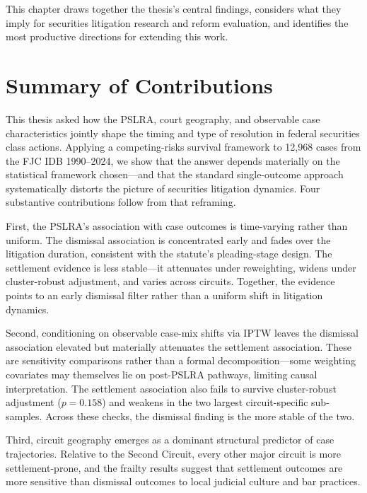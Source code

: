 
This chapter draws together the thesis's central findings,
considers what they imply for securities litigation research
and reform evaluation, and identifies the most productive
directions for extending this work.

\section{Summary of Contributions}

This thesis asked how the PSLRA, court geography, and
observable case characteristics jointly shape the timing and
type of resolution in federal securities class actions.
Applying a competing-risks survival framework to 12,968 cases
from the FJC IDB 1990--2024, we show
that the answer depends materially on the statistical
framework chosen---and that the standard single-outcome
approach systematically distorts the picture of securities
litigation dynamics. Four substantive contributions follow from that reframing.

First, the PSLRA's association with case outcomes is
time-varying rather than uniform. The dismissal association
is concentrated early and fades over the litigation duration,
consistent with the statute's pleading-stage design. The
settlement evidence is less stable---it attenuates under
reweighting, widens under cluster-robust adjustment, and
varies across circuits. Together, the evidence points to an early dismissal filter rather than a uniform shift in litigation dynamics.

Second, conditioning on observable case-mix shifts via IPTW
leaves the dismissal association elevated but materially
attenuates the settlement association. These are sensitivity
comparisons rather than a formal decomposition---some
weighting covariates may themselves lie on post-PSLRA
pathways, limiting causal interpretation. The settlement
association also fails to survive cluster-robust adjustment
($p = 0.158$) and weakens in the two largest circuit-specific
sub-samples. Across these checks, the dismissal finding is
the more stable of the two.

Third, circuit geography emerges as a dominant structural
predictor of case trajectories. Relative to the Second
Circuit, every other major circuit is more settlement-prone,
and the frailty results suggest that settlement outcomes are
more sensitive than dismissal outcomes to local judicial
culture and bar practices.

